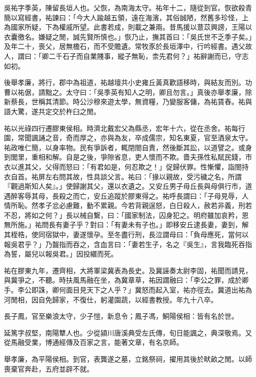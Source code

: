 
\begin{pinyinscope}
吳祐字季英，陳留長垣人也。父恢，為南海太守。祐年十二，隨從到官。恢欲殺青簡以寫經書，祐諫曰：「今大人踰越五領，遠在海濱，其俗誠陋，然舊多珍怪，上為國家所疑，下為權戚所望。此書若成，則載之兼兩。昔馬援以薏苡興謗，王陽以衣囊徼名。嫌疑之閒，誠先賢所慎也。」恢乃止，撫其首曰：「吳氏世不乏季子矣。」及年二十，喪父，居無檐石，而不受贍遺。常牧豕於長垣澤中，行吟經書。遇父故人，謂曰：「卿二千石子而自業賤事，縱子無恥，柰先君何？」祐辭謝而已，守志如初。

後舉孝廉，將行，郡中為祖道，祐越壇共小史雍丘黃真歡語移時，與結友而別。功曹以祐倨，請黜之。太守曰：「吳季英有知人之明，卿且勿言。」真後亦舉孝廉，除新蔡長，世稱其清節。時公沙穆來遊太學，無資糧，乃變服客傭，為祐賃舂。祐與語大驚，遂共定交於杵臼之閒。

祐以光祿四行遷膠東侯相。時濟北戴宏父為縣丞，宏年十六，從在丞舍。祐每行園，常聞諷誦之音，奇而厚之，亦與為友，卒成儒宗，知名東夏，官至酒泉太守。祐政唯仁簡，以身率物。民有爭訴者，輒閉閤自責，然後斷其訟，以道譬之。或身到閭里，重相和解。自是之後，爭隙省息，吏人懷而不欺。嗇夫孫性私賦民錢，市衣以進其父，父得而怒曰：「有君如是，何忍欺之！」促歸伏罪。性慚懼，詣閤持衣自首。祐屏左右問其故，性具談父言。祐曰：「掾以親故，受污穢之名，所謂『觀過斯知人矣』。」使歸謝其父，還以衣遺之。又安丘男子毋丘長與母俱行市，道遇醉客辱其母，長殺之而亡，安丘追蹤於膠東得之。祐呼長謂曰：「子母見辱，人情所恥。然孝子忿必慮難，動不累親。今若背親逞怒，白日殺人，赦若非義，刑若不忍，將如之何？」長以械自繫，曰：「國家制法，囚身犯之。明府雖加哀矜，恩無所施。」祐問長有妻子乎？對曰：「有妻未有子也。」即移安丘逮長妻，妻到，解其桎梏，使同宿獄中，妻遂懷孕。至冬盡行刑，長泣謂母曰：「負母應死，當何以報吳君乎？」乃齧指而吞之，含血言曰：「妻若生子，名之『吳生』，言我臨死吞指為誓，屬兒以報吳君。」因投繯而死。

祐在膠東九年，遷齊相，大將軍梁冀表為長史。及冀誣奏太尉李固，祐聞而請見，與冀爭之，不聽。時扶風馬融在坐，為冀章草，祐因謂融曰：「李公之罪，成於卿手。李公即誅，卿何面目見天下之人乎？」冀怒而起入室，祐亦徑去。冀道出祐為河閒相，因自免歸家，不復仕，躬灌園蔬，以經書教授。年九十八卒。

長子鳳，官至樂浪太守，少子愷，新息令；鳳子馮，鮦陽侯相：皆有名於世。

延篤字叔堅，南陽犨人也。少從潁川唐溪典受左氏傳，旬日能諷之，典深敬焉。又從馬融受業，博通經傳及百家之言，能著文章，有名京師。

舉孝廉，為平陽侯相。到官，表龔遂之墓，立銘祭祠，擢用其後於畎畝之閒。以師喪棄官奔赴，五府並辟不就。


\end{pinyinscope}
